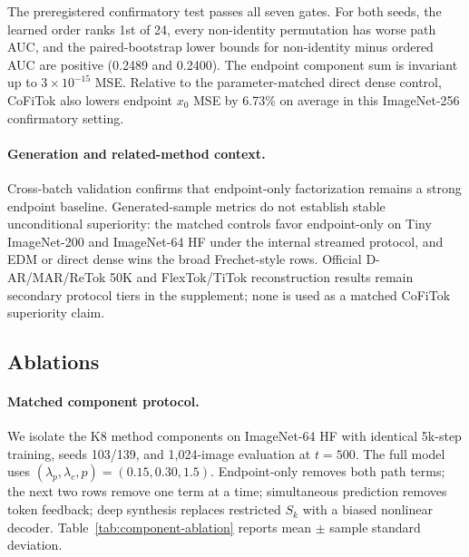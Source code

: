 \documentclass[letterpaper]{article}
\newcommand{\method}{CoFiTok}
\begin{document}
\begin{table}[t]
  \centering
  \scriptsize
  \caption{ImageNet-256 K4 20k confirmatory order and endpoint results over
  1,024 validation images at $t=500$.}
  \label{tab:imagenet256-confirmatory-order}
\end{table}

The preregistered confirmatory test passes all seven gates. For both seeds, the
learned order ranks 1st of 24, every non-identity permutation has worse path
AUC, and the paired-bootstrap lower bounds for non-identity minus ordered AUC
are positive (0.2489 and 0.2400). The endpoint component sum is invariant up to
$3\times10^{-15}$ MSE. Relative to the parameter-matched direct dense control,
\method{} also lowers endpoint $x_0$ MSE by 6.73\% on average in this
ImageNet-256 confirmatory setting.

\paragraph{Generation and related-method context.}
Cross-batch validation confirms that endpoint-only factorization remains a
strong endpoint baseline. Generated-sample metrics do not establish stable
unconditional superiority: the matched controls favor endpoint-only on Tiny
ImageNet-200 and ImageNet-64 HF under the internal streamed protocol, and EDM
or direct dense wins the broad Frechet-style rows. Official D-AR/MAR/ReTok 50K
and FlexTok/TiTok reconstruction results remain secondary protocol tiers in the
supplement; none is used as a matched \method{} superiority claim.

\subsection{Ablations}

\paragraph{Matched component protocol.}
We isolate the K8 method components on ImageNet-64 HF with identical 5k-step
training, seeds 103/139, and 1,024-image evaluation at $t=500$. The full model
uses $(\lambda_p,\lambda_c,p)=(0.15,0.30,1.5)$. Endpoint-only removes both path
terms; the next two rows remove one term at a time; simultaneous prediction
removes token feedback; deep synthesis replaces restricted $S_k$ with a biased
nonlinear decoder. Table~\ref{tab:component-ablation} reports mean $\pm$ sample
standard deviation.
\end{document}
